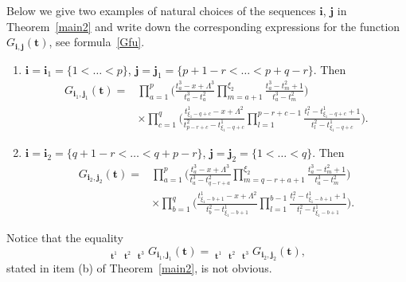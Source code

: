 \documentclass[pdftex]{sigma}
\numberwithin{equation}{section}
\DeclareMathOperator{\Symb}{\overline{Sym} }
\begin{document}
\begin{Example} Below we give two examples of natural choices of the sequences $\boldsymbol{i}$, $\boldsymbol{j}$ in Theorem~\ref{main2} and write down the corresponding expressions for the function $G_{\boldsymbol{i},\boldsymbol{j}}( \boldsymbol{t})$, see formula~\eqref{Gfu}.
\begin{enumerate}\itemsep=0pt
\item[$(a)$]
$\boldsymbol{i}=\boldsymbol{i}_1=\{1<\dots<p\}$, $\boldsymbol{j}=\boldsymbol{j}_1=\{p+1-r<\dots<p+q-r\}$. Then
\begin{align*}
G_{\boldsymbol{i}_1,\boldsymbol{j}_1}( \boldsymbol{t})={}& \prod_{a=1}^{p}\Biggl( \frac{t^3_a-x+\Lambda^3}{t_a^3-t^2_a}\prod_{ m=a+1}^{\xi_2} \frac{t_a^3-t^2_m+1}{t_a^3-t^2_m}\Biggr)\\
&{\times}\prod_{c=1}^{q} \Biggl( \frac{t_{\xi_1-q+c}^1-x+\Lambda^2}{t^2_{p-r+c}-t^1_{\xi_1-q+c}}\prod_{ l=1}^{p-r+c-1} \frac{t^2_l-t_{\xi_1-q+c}^1+1}{t^2_l-t^1_{\xi_1-q+c}}\Biggr).
\end{align*}

\item[$(b)$] $\boldsymbol{i}=\boldsymbol{i}_2=\{q+1-r< \dots<q+p-r\}$, $\boldsymbol{j}=\boldsymbol{j}_2=\{1<\dots<q\}$. Then
\begin{align*}
G_{\boldsymbol{i}_2,\boldsymbol{j}_2}( \boldsymbol{t})={}& \prod_{a=1}^{p}\Biggl( \frac{t^3_a-x+\Lambda^3}{t_a^3-t^2_{q-r+a}}\prod_{ m=q-r+a+1}^{\xi_2} \frac{t_a^3-t^2_m+1}{t_a^3-t^2_m}\Biggr)\\
&{\times}\prod_{b=1}^{q} \Biggl( \frac{t_{\xi_1-b+1}^1-x+\Lambda^2}{t^2_{b}-t^1_{\xi_1-b+1}} \prod_{ l=1}^{b-1} \frac{t^2_l-t_{\xi_1-b+1}^1+1}{t^2_l-t^1_{\xi_1-b+1}}\Biggr).
\end{align*}
\end{enumerate}
Notice that the equality
\begin{equation*}
\Symb_{\boldsymbol{t}^1} \Symb_{\boldsymbol{t}^2} \Symb_{\boldsymbol{t}^3} G_{\boldsymbol{i}_1,\boldsymbol{j}_1}(\boldsymbol{t}) = \Symb_{\boldsymbol{t}^1} \Symb_{\boldsymbol{t}^2} \Symb_{\boldsymbol{t}^3} G_{\boldsymbol{i}_2,\boldsymbol{j}_2}(\boldsymbol{t}), \end{equation*}
stated in item (b) of Theorem~\ref{main2}, is not obvious.
\end{Example}
\end{document}
